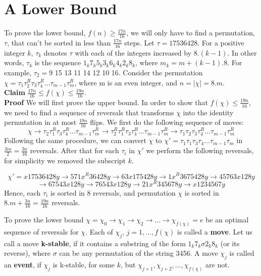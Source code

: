 \section{A Lower Bound}

To prove the lower bound, $f(n) \geq \frac{17n}{16}$, we will only have to find a permutation, $\tau$, that can't be sorted in less than $\frac{17n}{16}$ steps. Let $\tau=17536428$. For a positive integer $k$, $\tau_k$ denotes $\tau$ with each of the integers increased by $8.(k-1)$. In other words, $\tau_k$ is the sequence $1_k7_k5_k3_k6_k4_k2_k8_k$, where $m_k = m+(k-1).8$. For example, $\tau_2 = $9 15 13 11 14 12 10 16. Consider the permutation $\chi=\tau_1\tau_2^R\tau_3\tau_4^R\ldots\tau_{m-1}\tau_m^R$, where m is an even integer, and $n = |\chi| = 8.m$.\\

\textbf{Claim} $\frac{17n}{16} \leq f(\chi) \leq \frac{19n}{16}$.\\
\textbf{Proof} We will first prove the upper bound. In order to show that $f(\chi) \leq \frac{19n}{16}$, we need to find a sequence of reversals that transforms $\chi$ into the identity permutation in at most $\frac{19n}{16}$ flips. We first do the following sequence of moves:
\[
\chi \longrightarrow{} \tau_2\tau_1^R\tau_3\tau_4^R\ldots\tau_{m-1}\tau_m^R  \longrightarrow{} \tau_2^R\tau_1^R\tau_3\tau_4^R\ldots\tau_{m-1}\tau_m^R \longrightarrow{} \tau_1\tau_2\tau_3\tau_4^R\ldots\tau_{m-1}\tau_m^R
\]
Following the same procedure, we can convert $\chi$ to $\chi\prime=\tau_1\tau_1\tau_3\tau_4\ldots\tau_{m-1}\tau_m$ in $\frac{3m}{2}=\frac{3n}{16}$ reversals. After that for each $\tau_i$ in $\chi\prime$ we perform the following reversals, for simplicity we removed the subscript $k$.  

\[
\chi\prime=x17536428y \longrightarrow{} 571x^{R}36428y \longrightarrow 63x175428y \longrightarrow 1x^{R}3675428y \longrightarrow 45763x128y 
\]
\[
\longrightarrow 67543x128y \longrightarrow 76543x128y \longrightarrow 21x^{R}345678y \longrightarrow x1234567y 
\]
Hence, each $\tau_i$ is sorted in 8 reversals, and permutation $\chi$ is sorted in $8.m + \frac{3n}{16} = \frac{19n}{16}$ reversals.

To prove the lower bound $\chi=\chi_0\longrightarrow\chi_1\longrightarrow\chi_2\longrightarrow\ldots\longrightarrow\chi_{f(\chi)}=e$ be an optimal sequence of reversals for $\chi$. Each of $\chi_j$, $j = 1, \ldots, f(\chi)$ is called a \textbf{move}. Let us call a move \textbf{k-stable}, if it contains a substring of the form  $1_k7_k\sigma2_k8_k$ (or its reverse), where $\sigma$ can be any permutation of the string 3456. A move $\chi_j$ is called an \textbf{event}, if $\chi_j$ is k-stable, for some $k$, but $\chi_{j+1}, \chi_{j+2}, \ldots, \chi_{f(\chi)}$ are not. \\[0.1in]

